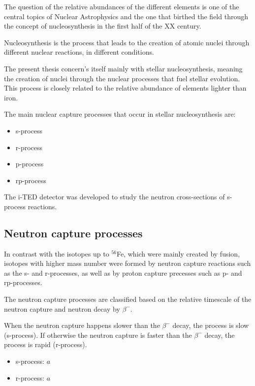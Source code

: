 The question of the relative abundances of the different elements is one of the central topics of Nuclear Astrophysics and the one that birthed the field through the concept of nucleosynthesis in the first half of the XX century.

Nucleosynthesis is the process that leads to the creation of atomic nuclei through different nuclear reactions, in different conditions.

The present thesis concern's itself mainly with stellar nucleosynthesis, meaning the creation of nuclei through the nuclear processes that fuel stellar evolution. This process is closely related to the relative abundance of elements lighter than iron.

The main nuclear capture processes that occur in stellar nucleosynthesis are:

\begin{itemize}
    \item s-process
    \item r-process
    \item p-process
    \item rp-process
\end{itemize}

The \ac{i-TED} detector was developed to study the neutron cross-sections of s-process reactions.

\subsection{Neutron capture processes}

In contrast with the isotopes up to $^{56}$Fe, which were mainly created by fusion, isotopes with higher mass number were formed by neutron capture reactions such as the s- and r-processes, as well as by proton capture precesses such as p- and rp-processes.

The neutron capture processes are classified based on the relative timescale of the neutron capture and neutron decay by $\beta^-$.

When the neutron capture happens slower than the $\beta^-$ decay, the process is slow (s-process). If otherwise the neutron capture is faster than the $\beta^-$ decay, the process is rapid (r-process).

\begin{itemize}
    \item s-process: $a$
    \item r-process: $a$
\end{itemize}

